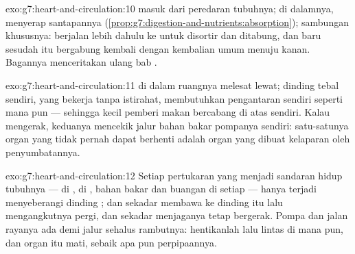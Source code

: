 \begin{solution}{exo:g7:heart-and-circulation:10}
 masuk dari peredaran tubuhnya; di dalamnya,   menyerap  santapannya
(\cref{prop:g7:digestion-and-nutrients:absorption}); sambungan
khususnya:  berjalan lebih dahulu ke  untuk disortir dan
ditabung, dan baru sesudah itu  bergabung kembali dengan
kembalian umum menuju  kanan. Bagannya menceritakan ulang bab
.
\end{solution}

\begin{solution}{exo:g7:heart-and-circulation:11}
 di dalam ruangnya melesat lewat; dinding tebal 
sendiri, yang bekerja tanpa istirahat, membutuhkan pengantaran
 sendiri seperti  mana pun --- sehingga  kecil
pemberi makan bercabang di atas  sendiri. Kalau mengerak,
keduanya mencekik jalur bahan bakar pompanya sendiri: satu-satunya
organ yang tidak pernah dapat berhenti adalah organ yang dibuat
kelaparan oleh penyumbatannya.
\end{solution}

\begin{solution}{exo:g7:heart-and-circulation:12}
Setiap pertukaran yang menjadi sandaran hidup tubuhnya ---  di
,  di , bahan bakar dan buangan di
setiap  --- hanya terjadi menyeberangi dinding ;  dan
 sekadar membawa  ke dinding itu lalu mengangkutnya pergi,
dan  sekadar menjaganya tetap bergerak. Pompa dan jalan rayanya
ada demi jalur sehalus rambutnya: hentikanlah lalu lintas  di
mana pun, dan organ itu mati, sebaik apa pun perpipaannya.
\end{solution}


